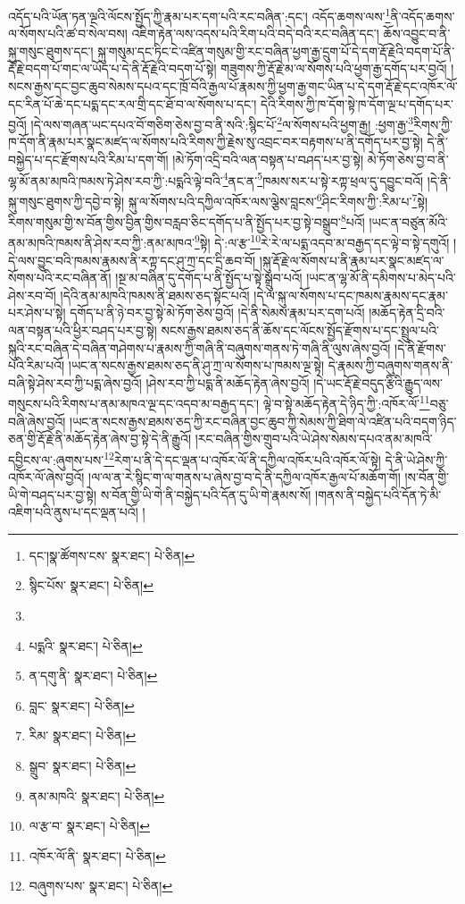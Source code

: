 འདོད་པའི་ཡོན་ཏན་ལྔའི་ལོངས་སྤྱོད་ཀྱི་རྣམ་པར་དག་པའི་རང་བཞིན་:དང་། འདོད་ཆགས་ལས་\footnote{དང་།སྣ་ཚོགས་ངས་  སྣར་ཐང་།  པེ་ཅིན། }ནི་འདོད་ཆགས་ལ་སོགས་པའི་ཚ་བ་སེལ་བས། འཇིག་རྟེན་ལས་འདས་པའི་རིག་པའི་བདེ་བའི་རང་བཞིན་དང་། ཆོས་འབྱུང་བ་ནི་སྐུ་གསུང་ཐུགས་དང་། སྐུ་གསུམ་དང་ཏིང་ངེ་འཛིན་གསུམ་གྱི་རང་བཞིན་ཕྱག་རྒྱ་དྲུག་པོ་དེ་དག་རྡོ་རྗེའི་བདག་པོ་ནི་རྡོ་རྗེ་བདག་པོ་གང་ལ་ཡོད་པ་དེ་ནི་རྡོ་རྗེའི་བདག་པོ་སྟེ། གཟུགས་ཀྱི་རྡོ་རྗེ་མ་ལ་སོགས་པའི་ཕྱག་རྒྱ་དགོད་པར་བྱའོ། །སངས་རྒྱས་དང་བྱང་ཆུབ་སེམས་དཔའ་དང་ཁྲོ་བོའི་རྒྱལ་པོ་རྣམས་ཀྱི་ཕྱག་རྒྱ་གང་ཡིན་པ་དེ་དག་རྡོ་རྗེ་དང་འཁོར་ལོ་དང་རིན་པོ་ཆེ་དང་པདྨ་དང་རལ་གྲི་དང་ཐོ་བ་ལ་སོགས་པ་དང་། དེའི་རིགས་ཀྱི་ཁ་དོག་སྟེ་ཁ་དོག་ལྔ་པ་དགོད་པར་བྱའོ། །དེ་ལས་གཞན་ཡང་དཔའ་བོ་གཅིག་ཅེས་བྱ་བ་ནི་སའི་:སྙིང་པོ་\footnote{སྙིང་པོས་  སྣར་ཐང་།  པེ་ཅིན། }ལ་སོགས་པའི་ཕྱག་རྒྱ། :ཕྱག་རྒྱ་\footnote{}རིགས་ཀྱི་ཁ་དོག་ནི་རྣམ་པར་སྣང་མཛད་ལ་སོགས་པའི་རིགས་ཀྱི་རྗེས་སུ་འབྲང་བར་བརྟགས་པ་ནི་དགོད་པར་བྱ་སྟེ། དེ་ནི་བསྐྱེད་པ་དང་རྫོགས་པའི་རིམ་པ་དག་གོ། །མེ་ཏོག་འདྲི་བའི་ལན་བསྟན་པ་བཤད་པར་བྱ་སྟེ། མེ་ཏོག་ཅེས་བྱ་བ་ནི་ལྷ་མོ་ནམ་མཁའི་ཁམས་ཏེ་ཤེས་རབ་ཀྱི་:པདྨའི་ལྟེ་བའི་\footnote{པདྨའི་  སྣར་ཐང་།  པེ་ཅིན། }ནང་ན་\footnote{ན་དགུ་ནི་  སྣར་ཐང་།  པེ་ཅིན། }ཁམས་སར་པ་སྟེ་རཀྟ་ཕྲལ་དུ་དབྱུང་བའོ། །དེ་ནི་སྐུ་གསུང་ཐུགས་ཀྱི་དབྱེ་བ་སྟེ། སྐུ་ལ་སོགས་པའི་དཀྱིལ་འཁོར་ལས་ལྕེས་བླངས་\footnote{བླང་  སྣར་ཐང་།  པེ་ཅིན། }ཤིང་རིགས་ཀྱི་:རིམ་པ་\footnote{རིམ་  སྣར་ཐང་།  པེ་ཅིན། }སྟེ། རིགས་གསུམ་གྱི་ས་བོན་གྱིས་བྱིན་གྱིས་བརླབ་ཅིང་དགོད་པ་ནི་སྤྱོད་པར་བྱ་སྟེ་བསྒྲུབ་\footnote{སྒྲུབ་  སྣར་ཐང་།  པེ་ཅིན། }པའོ། །ཡང་ན་བཙུན་མོའི་ནམ་མཁའི་ཁམས་ནི་ཤེས་རབ་ཀྱི་:ནམ་མཁའ་\footnote{ནམ་མཁའི་  སྣར་ཐང་།  པེ་ཅིན། }སྟེ། དེ་:ལ་རྩ་\footnote{ལ་རྩ་བ་  སྣར་ཐང་།  པེ་ཅིན། }རེ་རེ་ལ་པདྨ་འདབ་མ་བརྒྱད་དང་ལྟེ་བ་སྟེ་དགུའོ། །དེ་ལས་བྱུང་བའི་ཁམས་རྣམས་ནི་རཀྟ་དང་ཤུ་ཀྲ་དང་དྲི་ཆབ་བོ། །སྐུ་རྡོ་རྗེ་ལ་སོགས་པ་ནི་རྣམ་པར་སྣང་མཛད་ལ་སོགས་པའི་རང་བཞིན་ནོ། །སྔ་མ་བཞིན་དུ་དགོད་པ་ནི་སྤྱོད་པ་སྟེ་སྒྲུབ་པའོ། །ཡང་ན་ལྷ་མོ་ནི་དམིགས་པ་མེད་པའི་ཤེས་རབ་བོ། །དེའི་ནམ་མཁའི་ཁམས་ནི་ཐམས་ཅད་སྟོང་པའོ། །དེ་ལ་སྐུ་ལ་སོགས་པ་དང་ཁམས་རྣམས་དང་རྣམ་པར་ཤེས་པ་སྟེ། དགོད་པ་ནི་ཉེ་བར་བྱ་སྟེ་མེ་ཏོག་ཅེས་བྱའོ། །དེ་ནི་སེམས་རྣམ་པར་དག་པའོ། །མཆོད་རྟེན་དྲི་བའི་ལན་བསྟན་པའི་ཕྱིར་བཤད་པར་བྱ་སྟེ། སངས་རྒྱས་ཐམས་ཅད་ནི་ཆོས་དང་ལོངས་སྤྱོད་རྫོགས་པ་དང་སྤྲུལ་པའི་སྐུའི་རང་བཞིན་དེ་བཞིན་གཤེགས་པ་རྣམས་ཀྱི་གཞི་ནི་བཞུགས་གནས་ཏེ་གཞི་ནི་ལུས་ཞེས་བྱའོ། །དེ་ནི་རྫོགས་པའི་རིམ་པའོ། །ཡང་ན་སངས་རྒྱས་ཐམས་ཅད་ནི་ཤུ་ཀྲ་ལ་སོགས་པ་ཁམས་ལྔ་སྟེ། དེ་རྣམས་ཀྱི་བཞུགས་གནས་ནི་བཞི་སྟེ་ཤེས་རབ་ཀྱི་པདྨ་ཞེས་བྱའོ། །ཤེས་རབ་ཀྱི་པདྨ་ནི་མཆོད་རྟེན་ཞེས་བྱའོ། །དེ་ཡང་རྡོ་རྗེ་བདུད་རྩིའི་རྒྱུད་ལས་གསུངས་པའི་རིགས་པ་ནམ་མཁའ་ལྔ་དང་འདབ་མ་བརྒྱད་དང་། ལྟེ་བ་སྟེ་མཆོད་རྟེན་དེ་ཉིད་ཀྱི་:འཁོར་ལོ་\footnote{འཁོར་ལོ་ནི་  སྣར་ཐང་།  པེ་ཅིན། }བཅུ་བཞི་ཞེས་བྱའོ། །ཡང་ན་སངས་རྒྱས་ཐམས་ཅད་ཀྱི་རང་བཞིན་བྱང་ཆུབ་ཀྱི་སེམས་ཀྱི་ཐིག་ལེ་འཛིན་པའི་བདག་ཉིད་ཅན་གྱི་རྡོ་རྗེ་ནི་མཆོད་རྟེན་ཞེས་བྱ་སྟེ་དེ་ནི་རྒྱུའོ། །རང་བཞིན་གྱིས་གྲུབ་པའི་ཡེ་ཤེས་སེམས་དཔའ་ནམ་མཁའི་དབྱིངས་ལ་:ཞུགས་པས་\footnote{བཞུགས་པས་  སྣར་ཐང་།  པེ་ཅིན། }རེག་པ་ནི་དེ་དང་ལྡན་པ་འཁོར་ལོ་ནི་དཀྱིལ་འཁོར་པའི་འཁོར་ལོ་སྟེ། དེ་ནི་ཡེ་ཤེས་ཀྱི་འཁོར་ལོ་ཞེས་བྱའོ། །ལ་ལ་ན་རེ་སྙིང་ག་ལ་གནས་པ་ཞེས་བྱ་བ་དེ་ནི་དཀྱིལ་འཁོར་རྒྱལ་པོ་མཆོག་གོ། །ས་བོན་གྱི་ཡི་གེ་བཤད་པར་བྱ་སྟེ། ས་བོན་གྱི་ཡི་གེ་ནི་བསྐྱེད་པའི་དོན་དུ་ཡི་གེ་རྣམས་སོ། །གནས་ནི་བསྐྱེད་པའི་དོན་ཏེ་མི་འཇིག་པའི་ནུས་པ་དང་ལྡན་པའོ། །
